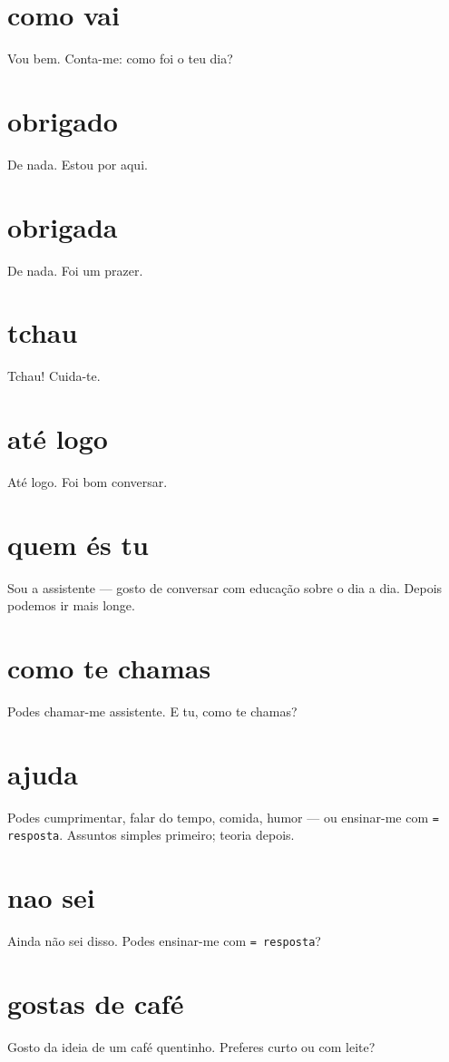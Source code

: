 \documentclass[11pt,a4paper]{article}
\newcommand{\code}[1]{\texttt{\small #1}}
\begin{document}
\section{como vai}
Vou bem. Conta-me: como foi o teu dia?

\section{obrigado}
De nada. Estou por aqui.

\section{obrigada}
De nada. Foi um prazer.

\section{tchau}
Tchau! Cuida-te.

\section{até logo}
Até logo. Foi bom conversar.

\section{quem és tu}
Sou a assistente --- gosto de conversar com educação sobre o dia a dia. Depois podemos ir mais longe.

\section{como te chamas}
Podes chamar-me assistente. E tu, como te chamas?

\section{ajuda}
Podes cumprimentar, falar do tempo, comida, humor --- ou ensinar-me com \code{= resposta}.
Assuntos simples primeiro; teoria depois.

\section{nao sei}
Ainda não sei disso. Podes ensinar-me com \code{= resposta}?

\section{gostas de café}
Gosto da ideia de um café quentinho. Preferes curto ou com leite?
\end{document}

